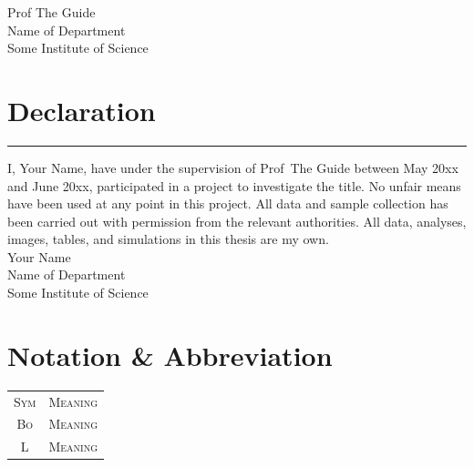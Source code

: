 \documentclass[a4paper, oneside, 11pt]{book}
\begin{document}
Prof The Guide\\
Name of Department\\
Some Institute of Science\\

\chapter*{Declaration}
\hrule
\vspace{1em}
I, Your Name, have under the supervision of Prof\ The Guide between May 20xx and June 20xx, participated in a project to investigate the title. No unfair means have been used at any point in this project. All data and sample collection has been carried out with permission from the relevant authorities. All data, analyses, images, tables, and simulations in this thesis are my own.\\

Your Name\\
Name of Department\\
Some Institute of Science\\[2em]
\newpage

\chapter*{Notation \& Abbreviation}
\begin{center}
\begin{tabular}{| c | l |}
\hline
	\textsc{Sym} & \textsc{Meaning}\\
	\textsc{Bo} & \textsc{Meaning}\\
	\textsc{L} & \textsc{Meaning}\\
	\hline\hline

\end{tabular}
\end{center}
\end{document}
